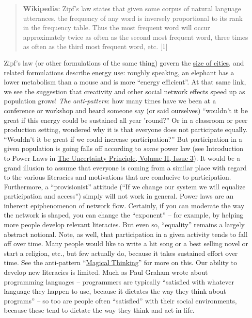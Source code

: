 \begin{quote}
\textbf{Wikipedia}: Zipf's law states that given some corpus of natural
language utterances, the frequency of any word is inversely proportional
to its rank in the frequency table. Thus the most frequent word will
occur approximately twice as often as the second most frequent word,
three times as often as the third most frequent word, etc. {[}1{]}
\end{quote}
Zipf's law (or other formulations of the same thing) govern the
\href{http://www2.econ.uu.nl/users/marrewijk/geography/zipf/index.htm}{size
of cities}, and related formulations describe
\href{http://pricetags.wordpress.com/2010/10/26/kleibers-law-growth-and-creativity-in-cities/}{energy
use}: roughly speaking, an elephant has a lower metabolism than a mouse
and is more ``energy efficient''. At that same link, we see the
suggestion that creativity and other social network effects speed up as
population grows! \emph{The anti-pattern}: how many times have we been
at a conference or workshop and heard someone say (or said ourselves)
``wouldn't it be great if this energy could be sustained all year
'round?'' Or in a classroom or peer production setting, wondered why it
is that everyone does not participate equally. ``Wouldn't it be great if
we could increase participation?'' But participation in a given
population is going falls off according to \emph{some} power law (see
Introduction to Power Laws in
\href{http://www.theuncertaintyprinciple.danoff.org/v2i3.html}{The
Uncertainty Principle, Volume II, Issue 3}). It would be a grand
illusion to assume that everyone is coming from a similar place with
regard to the various literacies and motivations that are conducive to
participation. Furthermore, a ``provisionist'' attitude (``If we change
our system we will equalize participation and access'') simply will not
work in general. Power laws are an inherent epiphenomenon of network
flow. Certainly, if you can
\href{http://peeragogy.org/practice/moderation/}{moderate} the way the
network is shaped, you can change the ``exponent'' -- for example, by
helping more people develop relevant literacies. But even so,
``equality'' remains a largely abstract notional. Note, as well, that
participation in a given activity tends to fall off over time. Many
people would like to write a hit song or a best selling novel or start a
religion, etc., but few actually do, because it takes sustained effort
over time. See the anti-pattern
``\href{http://peeragogy.org/antipatterns/magical-thinking/}{Magical
Thinking}'' for more on this. Our ability to develop new literacies is
limited. Much as Paul Graham wrote about programming languages --
programmers are typically ``satisfied with whatever language they happen
to use, because it dictates the way they think about programs'' -- so
too are people often ``satisfied'' with their social environments,
because these tend to dictate the way they think and act in life.

